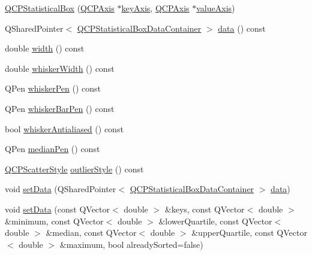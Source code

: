 \begin{DoxyCompactItemize}
\item 
\hyperlink{class_q_c_p_statistical_box_a75c2b3e7fcd0741cc981693a2ba63b27}{Q\+C\+P\+Statistical\+Box} (\hyperlink{class_q_c_p_axis}{Q\+C\+P\+Axis} $\ast$\hyperlink{class_q_c_p_abstract_plottable_a2cdd6f0dd5e9a979037f86b4000d9cfe}{key\+Axis}, \hyperlink{class_q_c_p_axis}{Q\+C\+P\+Axis} $\ast$\hyperlink{class_q_c_p_abstract_plottable_af47809a644a68ffd955fb30b01fb4f2f}{value\+Axis})
\item 
Q\+Shared\+Pointer$<$ \hyperlink{qcustomplot_8h_a8b773c0c35f8f924701ced6e9915e4c7}{Q\+C\+P\+Statistical\+Box\+Data\+Container} $>$ \hyperlink{class_q_c_p_statistical_box_a728e501413eaf191544014173d52dfbc}{data} () const
\item 
double \hyperlink{class_q_c_p_statistical_box_ae589b7481dec6ef8e50ebb6492d296f1}{width} () const
\item 
double \hyperlink{class_q_c_p_statistical_box_aacfa6686c7cf4af18794ec02354f4782}{whisker\+Width} () const
\item 
Q\+Pen \hyperlink{class_q_c_p_statistical_box_a67e5144f07645fe25c31001c460817fc}{whisker\+Pen} () const
\item 
Q\+Pen \hyperlink{class_q_c_p_statistical_box_a47ed9ad9d2ca65640319a2f071982ed4}{whisker\+Bar\+Pen} () const
\item 
bool \hyperlink{class_q_c_p_statistical_box_a2015a8ea758cf65a41d4a6c52a20696b}{whisker\+Antialiased} () const
\item 
Q\+Pen \hyperlink{class_q_c_p_statistical_box_af767bc7b6b477d005535314b35aca683}{median\+Pen} () const
\item 
\hyperlink{class_q_c_p_scatter_style}{Q\+C\+P\+Scatter\+Style} \hyperlink{class_q_c_p_statistical_box_aef92e38fcb8e5041a44c2e01886e3b66}{outlier\+Style} () const
\item 
void \hyperlink{class_q_c_p_statistical_box_a08a6da55822bad825ee25a8069b9b52f}{set\+Data} (Q\+Shared\+Pointer$<$ \hyperlink{qcustomplot_8h_a8b773c0c35f8f924701ced6e9915e4c7}{Q\+C\+P\+Statistical\+Box\+Data\+Container} $>$ \hyperlink{class_q_c_p_statistical_box_a728e501413eaf191544014173d52dfbc}{data})
\item 
void \hyperlink{class_q_c_p_statistical_box_a4ae198e66243d8cc57ad8893c37bf9d4}{set\+Data} (const Q\+Vector$<$ double $>$ \&keys, const Q\+Vector$<$ double $>$ \&minimum, const Q\+Vector$<$ double $>$ \&lower\+Quartile, const Q\+Vector$<$ double $>$ \&median, const Q\+Vector$<$ double $>$ \&upper\+Quartile, const Q\+Vector$<$ double $>$ \&maximum, bool already\+Sorted=false)

\end{DoxyCompactItemize}

